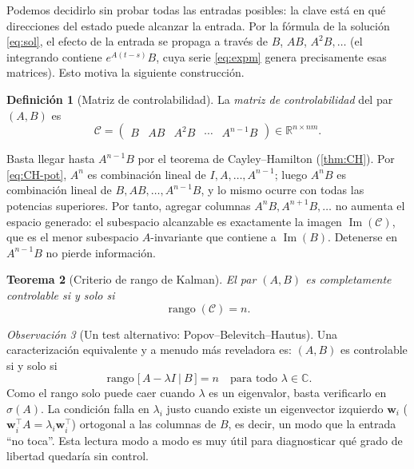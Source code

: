 \documentclass[11pt,letterpaper]{article}
\theoremstyle{definition}
\newtheorem{definicion}{Definición}[section]
\theoremstyle{plain}
\newtheorem{teorema}[definicion]{Teorema}
\theoremstyle{remark}
\newtheorem{observacion}[definicion]{Observación}
\DeclareMathOperator{\rank}{rango}
\DeclareMathOperator{\Imo}{Im}
\newcommand{\R}{\mathbb{R}}
\newcommand{\C}{\mathbb{C}}
\newcommand{\calC}{\mathcal{C}}
\begin{document}
Podemos decidirlo sin probar todas las entradas posibles: la clave está en
qué direcciones del estado puede alcanzar la entrada. Por la fórmula de la
solución \cref{eq:sol}, el efecto de la entrada se propaga a través de
$B$, $AB$, $A^2B,\dots$ (el integrando contiene $e^{A(t-s)}B$, cuya serie
\cref{eq:expm} genera precisamente esas matrices). Esto motiva la
siguiente construcción.

\begin{definicion}[Matriz de controlabilidad]
\label{def:Cmat}
La \emph{matriz de controlabilidad} del par $(A,B)$ es
\begin{equation}\label{eq:Cmat}
  \calC=\begin{pmatrix}B & AB & A^2B & \cdots & A^{n-1}B\end{pmatrix}
        \in\R^{n\times nm}.
\end{equation}
\end{definicion}

Basta llegar hasta $A^{n-1}B$ por el teorema de
Cayley--Hamilton (\cref{thm:CH}). Por \cref{eq:CH-pot}, $A^n$ es
combinación lineal de $I,A,\dots,A^{n-1}$; luego $A^nB$ es combinación
lineal de $B,AB,\dots,A^{n-1}B$, y lo mismo ocurre con todas las potencias
superiores. Por tanto, agregar columnas $A^nB,A^{n+1}B,\dots$ no aumenta
el espacio generado: el subespacio alcanzable es exactamente la imagen
$\Imo(\calC)$, que es el menor subespacio $A$-invariante que contiene a
$\Imo(B)$. Detenerse en $A^{n-1}B$ no pierde información.

\begin{teorema}[Criterio de rango de Kalman]
\label{thm:kalman}
El par $(A,B)$ es completamente controlable si y solo si
\begin{equation}\label{eq:rankC}
  \rank(\calC)=n.
\end{equation}
\end{teorema}


\begin{observacion}[Un test alternativo: Popov--Belevitch--Hautus]
\label{obs:PBH}
Una caracterización equivalente y a menudo más reveladora es: $(A,B)$ es
controlable si y solo si
\begin{equation}\label{eq:PBH}
  \rank\bigl[\,A-\lambda I \ \big|\ B\,\bigr]=n
  \quad\text{para todo }\lambda\in\C.
\end{equation}
Como el rango solo puede caer cuando $\lambda$ es un eigenvalor, basta
verificarlo en $\sigma(A)$. La condición falla en $\lambda_i$ justo
cuando existe un eigenvector izquierdo $\bm w_i$ ($\bm w_i^\top A=\lambda_i
\bm w_i^\top$) ortogonal a las columnas de $B$, es decir, un modo que la
entrada ``no toca''. Esta lectura modo a modo es muy útil para diagnosticar
qué grado de libertad quedaría sin control.
\end{observacion}
\end{document}
